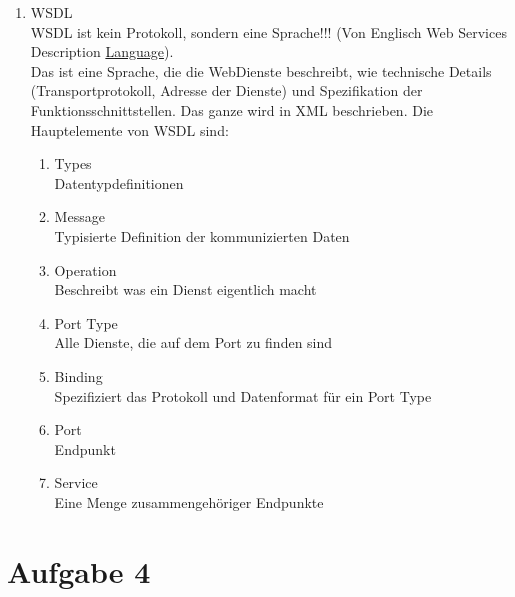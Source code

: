 \begin{enumerate}
\begin{enumerate}
\item WSDL \\
WSDL ist kein Protokoll, sondern eine Sprache!!! (Von Englisch Web Services Description \underline{Language}). \\
Das ist eine Sprache, die die WebDienste beschreibt, wie technische Details (Transportprotokoll, Adresse der Dienste) und Spezifikation der Funktionsschnittstellen. Das ganze wird in XML beschrieben. Die Hauptelemente von WSDL sind:

\begin{enumerate}

\item Types \\
Datentypdefinitionen
\item Message \\
Typisierte Definition der kommunizierten Daten
\item Operation \\
Beschreibt was ein Dienst eigentlich macht
\item Port Type \\
Alle Dienste, die auf dem Port zu finden sind
\item Binding \\
Spezifiziert das Protokoll und Datenformat für ein Port Type
\item Port \\
Endpunkt
\item Service \\
Eine Menge zusammengehöriger Endpunkte 

\end{enumerate}

\end{enumerate}

\end{enumerate}

\section*{Aufgabe 4}


